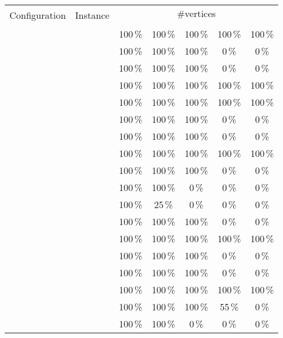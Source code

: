 \begin{table}
	\centering
	\small
	\begin{tabular}{|l|l|ccccc|}
		\hline
		\multirow{2}{*}{Configuration} & \multirow{2}{*}{Instance} & \multicolumn{5}{|c|}{\#vertices} \\
		& &  &  &  &  &  \\
		\hline
		\hline
		\multirow{4}{*}{\vdefault}
			& \walk           & 100\,\% & 100\,\% & 100\,\% & 100\,\% & 100\,\% \\
			& \sinewalk       & 100\,\% & 100\,\% & 100\,\% &   0\,\% &   0\,\% \\
			& \parabolawalk   & 100\,\% & 100\,\% & 100\,\% &   0\,\% &   0\,\% \\
			& \concavevalleys & 100\,\% & 100\,\% & 100\,\% & 100\,\% & 100\,\% \\
		\hline
		\multirow{4}{*}{\vnodom}
			& \walk           & 100\,\% & 100\,\% & 100\,\% & 100\,\% & 100\,\% \\
			& \sinewalk       & 100\,\% & 100\,\% & 100\,\% &   0\,\% &   0\,\% \\
			& \parabolawalk   & 100\,\% & 100\,\% & 100\,\% &   0\,\% &   0\,\% \\
			& \concavevalleys & 100\,\% & 100\,\% & 100\,\% & 100\,\% & 100\,\% \\
		\hline
		\multirow{4}{*}{\vnow}
			& \walk           & 100\,\% & 100\,\% & 100\,\% &   0\,\% &   0\,\% \\
			& \sinewalk       & 100\,\% & 100\,\% &   0\,\% &   0\,\% &   0\,\% \\
			& \parabolawalk   & 100\,\% &  25\,\% &   0\,\% &   0\,\% &   0\,\% \\
			& \concavevalleys & 100\,\% & 100\,\% & 100\,\% &   0\,\% &   0\,\% \\
		\hline
		\hline
		\multirow{4}{*}{\pdefault}
			& \walk           & 100\,\% & 100\,\% & 100\,\% & 100\,\% & 100\,\% \\
			& \sinewalk       & 100\,\% & 100\,\% & 100\,\% &   0\,\% &   0\,\% \\
			& \parabolawalk   & 100\,\% & 100\,\% & 100\,\% &   0\,\% &   0\,\% \\
			& \concavevalleys & 100\,\% & 100\,\% & 100\,\% & 100\,\% & 100\,\% \\
		\hline
		\multirow{4}{*}{\pnoedge}
			& \walk           & 100\,\% & 100\,\% & 100\,\% &  55\,\% &   0\,\% \\
			& \sinewalk       & 100\,\% & 100\,\% &   0\,\% &   0\,\% &   0\,\% \\

\end{tabular}
\end{table}
